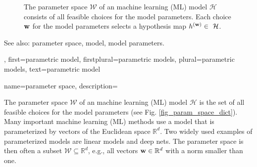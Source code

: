 {{{\begin{figure}[H]
\begin{center}
			\end{center} 
			\caption{The parameter space $\mathcal{W}$ of an machine learning (ML) model $\mathcal{H}$ consists of all 
			feasible choices for the model parameters. Each choice ${\bf w}$ for the model parameters 
			selects a hypothesis map $h^{({\bf w})} \in \mathcal{H}$.
				 \label{fig_param_model_dict}} 
			\end{figure}
			See also: parameter space, model, model parameters.},
		first={parametric model},
		firstplural={parametric models},
		plural={parametric models},
		text={parametric model}
}


{name={parameter space},
	description={The parameter space $\mathcal{W}$ of 
		an machine learning (ML) model $\mathcal{H}$ is the set of all feasible choices for the 
		model parameters (see Fig. \ref{fig_param_space_dict}). Many important machine learning (ML) methods 
		use a model that is parameterized by vectors of the Euclidean space $\mathbb{R}^{d}$. 
		Two widely used examples of parameterized models are linear models 
		and deep nets. The parameter space is then often a subset $\mathcal{W} \subseteq \mathbb{R}^{d}$, 
		e.g., all vectors ${\bf w} \in \mathbb{R}^{d}$ with a norm smaller than one.
		\begin{figure}[H]
			\begin{center}
			\begin{tikzpicture}
				

\end{tikzpicture}
\end{center}
\end{figure}}}}
